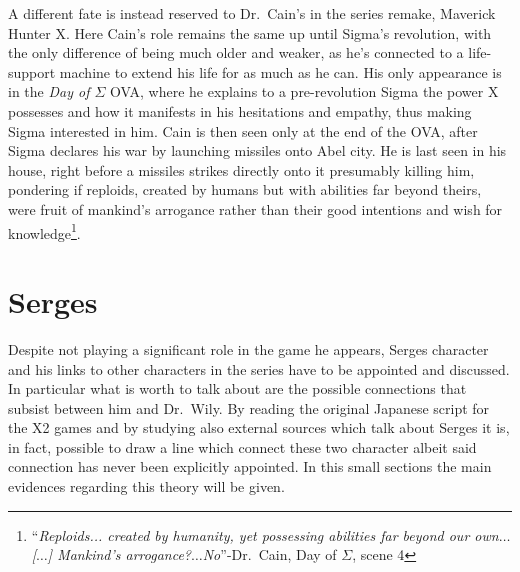 A different fate is instead reserved to Dr.~Cain's in the series remake, Maverick Hunter X. Here Cain's role remains the same up until Sigma's revolution, with the only difference of being much older and weaker, as he's connected to a life-support machine to extend his life for as much as he can. His only appearance is in the \emph{Day of $\Sigma$} OVA, where he explains to a pre-revolution Sigma the power X possesses and how it manifests in his hesitations and empathy, thus making Sigma interested in him. Cain is then seen only at the end of the OVA, after Sigma declares his war by launching missiles onto Abel city. He is last seen in his house, right before a missiles strikes directly onto it presumably killing him, pondering if reploids, created by humans but with abilities far beyond theirs, were fruit of mankind's arrogance rather than their good intentions and wish for knowledge\footnote{``\textit{Reploids... created by humanity, yet possessing abilities far beyond our own$\dots$ [$\dots$] Mankind's arrogance?$\dots$No}''-Dr.~Cain, Day of $\Sigma$, scene 4}.


\section{Serges} \label{char:Serges}
Despite not playing a significant role in the game he appears, Serges character and his links to other characters in the series have to be appointed and discussed. In particular what is worth to talk about are the possible connections that subsist between him and Dr.~Wily. By reading the original Japanese script for the X2 games and by studying also external sources which talk about Serges it is, in fact, possible to draw a line which connect these two character albeit said connection has never been explicitly appointed. In this small sections the main evidences regarding this theory will be given.

